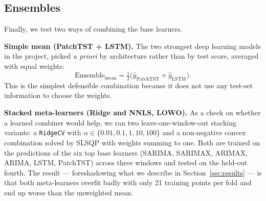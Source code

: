 \subsection{Ensembles}

Finally, we test two ways of combining the base learners.

\noindent
\textbf{Simple mean (PatchTST + LSTM).} The two strongest deep
learning models in the project, picked \emph{a priori} by architecture
rather than by test score, averaged with equal weights:
\begin{equation*}
\text{Ensemble}_{\text{mean}} = \tfrac{1}{2} \big(\hat{y}_{\text{PatchTST}} + \hat{y}_{\text{LSTM}}\big).
\end{equation*}
This is the simplest defensible combination because it does not use
any test-set information to choose the weights.

\noindent
\textbf{Stacked meta-learners (Ridge and NNLS, LOWO).} As a check on
whether a learned combiner would help, we ran two leave-one-window-out
stacking variants: a \texttt{RidgeCV} with $\alpha \in
\{0.01, 0.1, 1, 10, 100\}$ and a non-negative convex combination
solved by SLSQP with weights summing to one. Both are trained on the
predictions of the six top base learners (SARIMA, SARIMAX, ARIMAX,
ARIMA, LSTM, PatchTST) across three windows and tested on the held-out
fourth. The result --- foreshadowing what we describe in
Section~\ref{sec:results} --- is that both meta-learners overfit
badly with only 21 training points per fold and end up worse than the
unweighted mean.
